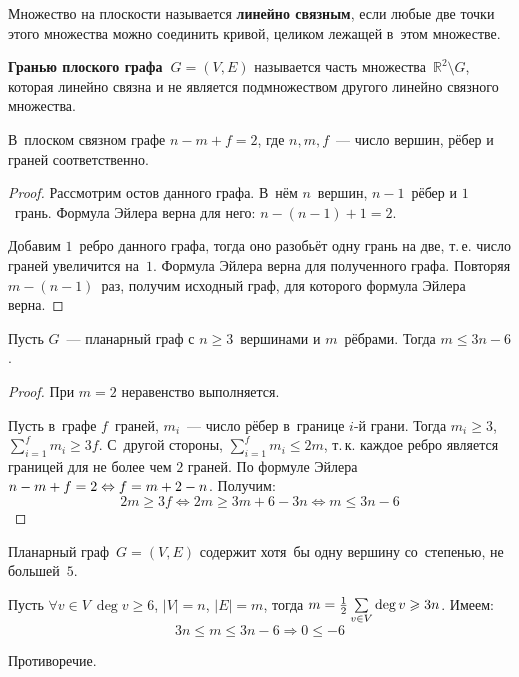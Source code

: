 Множество на плоскости называется \textbf{линейно связным}, если любые две точки этого множества можно соединить кривой, целиком лежащей в~этом множестве.

 \textbf{Гранью плоского графа~$G = (V, E)$} называется часть множества~$\mathbb R^2 \setminus G$, которая линейно связна и не является подмножеством другого линейно связного множества.

\begin{theorem}
В~плоском связном графе $n - m + f = 2$, где $n, m, f$~--- число вершин, рёбер и граней соответственно.
\end{theorem}
\begin{proof}
Рассмотрим остов данного графа.
В~нём $n$~вершин, $n - 1$~рёбер и $1$~грань.
Формула Эйлера верна для него: $n - (n - 1) + 1 = 2$.

Добавим $1$~ребро данного графа, тогда оно разобьёт одну грань на две, т.\,е. число граней увеличится на~$1$.
Формула Эйлера верна для полученного графа.
Повторяя $m - (n - 1)$~раз, получим исходный граф, для которого формула Эйлера верна.
\end{proof}

\begin{theorem}
\label{th:property_of_planarity_of_graph}
Пусть $G$~--- планарный граф с $n \geqslant 3$~вершинами и $m$~рёбрами. Тогда $m \leqslant 3n - 6$.
\end{theorem}
\begin{proof}
При $m = 2$ неравенство выполняется.

Пусть в~графе $f$~граней, $m_i$~--- число рёбер в~границе $i$-й грани.
Тогда $m_i \geqslant 3$, $\sum\limits_{i=1}^f m_i \geqslant 3f$.
С~другой стороны, $\sum\limits_{i=1}^f m_i \leqslant 2m$, т.\,к. каждое ребро является границей для не более чем $2$ граней.
По формуле Эйлера $n - m + f = 2 \opbr\Leftrightarrow f = m + 2 - n$.
Получим:
\begin{equation*}
2m \geqslant 3f \Leftrightarrow 2m \geqslant 3m + 6 - 3n \Leftrightarrow m \leqslant 3n - 6
\end{equation*}
\end{proof}

\begin{consequent}
Планарный граф~$G = (V, E)$ содержит хотя~бы одну вершину со~степенью, не большей~$5$.
\end{consequent}
\begin{proofcontra}
Пусть $\forall v \in V \ \deg v \geqslant 6$, $|V| = n$, $|E| = m$, тогда
$m \opbr= \frac12 \sum\limits_{v \in V} \deg v \opbr\geqslant 3n$.
Имеем:
\begin{equation*}
3n \leqslant m \leqslant 3n - 6 \Rightarrow 0 \leqslant -6
\end{equation*}

Противоречие.
\end{proofcontra}

